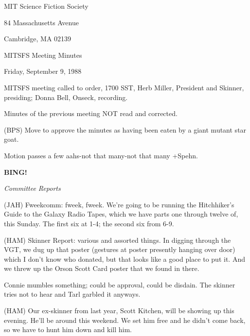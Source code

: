 \documentclass[12pt]{article}
\newcommand{\bing}{{\bf BING!} }
\newcommand{\goto}[1]{\bing \vskip 12pt \centerline{{\em{#1}}}}
\begin{document}
\begin{center}

MIT Science Fiction Society 

84 Massachusetts Avenue

Cambridge, MA 02139

\vspace{12pt}

MITSFS Meeting Minutes 

Friday, September 9, 1988

\end{center}
 
\vspace{18pt}

\setlength{\parskip}{6pt}

\noindent
MITSFS meeting called to order, 1700 SST,
Herb Miller, President and Skinner, presiding; Donna Bell, Onseck, recording.

Minutes of the previous meeting NOT read and corrected.

(BPS) Move to approve the minutes as having been eaten by a giant mutant star goat.

Motion passes a few aahs-not that many-not that many +Spehn.

\goto{Committee Reports}

(JAH) Fweekcomm: fweek, fweek. We're going to be running the Hitchhiker's Guide to the Galaxy Radio Tapes, which we have parts one through twelve of, this Sunday. The first six at 1-4; the second six from 6-9.

(HAM) Skinner Report: various and assorted things. In digging through the VGT, we dug up that poster (gestures at poster presently hanging over door) which I don't know who donated, but that looks like a good place to put it. And we threw up the Orson Scott Card poster that we found in there.

Connie mumbles something; could be approval, could be disdain. The skinner tries not to hear and Tarl garbled it anyways.

(HAM) Our ex-skinner from last year, Scott Kitchen, will be showing up this evening. He'll be around this weekend. We set him free and he didn't come back, so we have to hunt him down and kill him.
\end{document}
